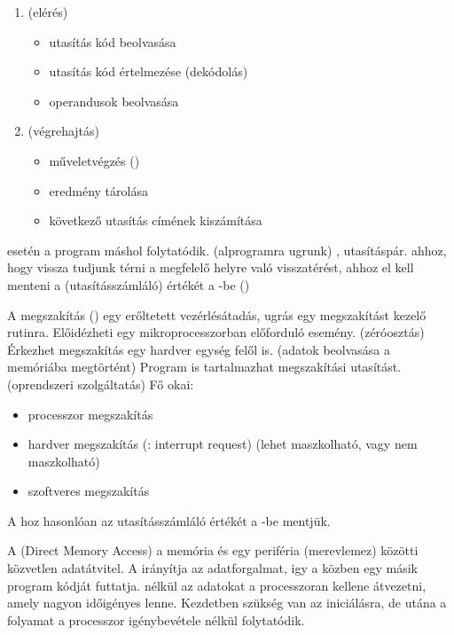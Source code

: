 \documentclass[main.tex]{subfiles}
\begin{document}
  \begin{enumerate}
    \item {} (elérés)
    \begin{itemize}
      \item utasítás kód beolvasása
      \item utasítás kód értelmezése (dekódolás)
      \item operandusok beolvasása
    \end{itemize}
    \item {} (végrehajtás)
    \begin{itemize}
      \item műveletvégzés ()
      \item eredmény tárolása
      \item következő utasítás címének kiszámítása
    \end{itemize}
  \end{enumerate}
  
   esetén a program máshol folytatódik.
  (alprogramra ugrunk)
  ,  utasításpár.
  ahhoz, hogy vissza tudjunk térni a megfelelő
  helyre való visszatérést, ahhoz el kell
  menteni a  (utasításszámláló) értékét a
  -be ()

  A megszakítás () egy erőltetett vezérlésátadás,
  ugrás egy megszakítást kezelő rutinra. Előidézheti
  egy mikroprocesszorban előforduló esemény. (zéróosztás)
  Érkezhet megszakítás egy hardver egység felől is.
  (adatok beolvasása a memóriába megtörtént)
  Program is tartalmazhat megszakítási utasítást.
  (oprendszeri szolgáltatás) Fő okai:
  \begin{itemize}
    \item processzor megszakítás
    \item hardver megszakítás (: interrupt request)
    (lehet maszkolható, vagy nem maszkolható)
    \item szoftveres megszakítás
  \end{itemize}
  A hoz hasonlóan
  az utasításszámláló értékét a -be mentjük.

  A  (Direct Memory Access) a memória
  és egy periféria (merevlemez) közötti közvetlen
  adatátvitel. A  irányítja az
  adatforgalmat, igy a  közben egy
  másik program kódját futtatja.  nélkül
  az adatokat a processzoran kellene átvezetni,
  amely nagyon időigényes lenne. Kezdetben szükség
  van az iniciálásra, de utána a folyamat a processzor
  igénybevétele nélkül folytatódik.
\end{document}
